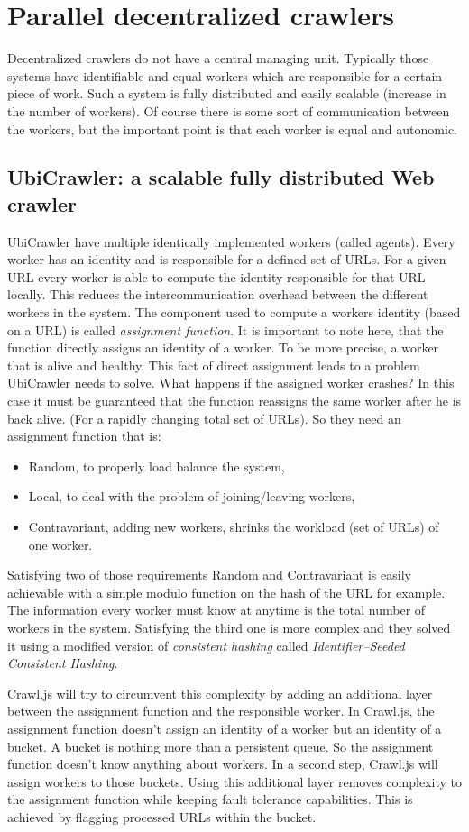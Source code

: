 \section{Parallel decentralized crawlers}
Decentralized crawlers do not have a central managing unit. Typically those systems have identifiable and equal workers which are responsible for a certain piece of work. Such a system is fully distributed and easily scalable (increase in the number of workers). Of course there is some sort of communication between the workers, but the important point is that each worker is equal and autonomic.

\subsection{UbiCrawler: a scalable fully distributed Web crawler \cite{ubicrawler}}
UbiCrawler have multiple identically implemented workers (called agents). Every worker has an identity and is responsible for a defined set of URLs. For a given URL every worker is able to compute the identity responsible for that URL locally. This reduces the intercommunication overhead between the different workers in the system. The component used to compute a workers identity (based on a URL) is called \emph{assignment function}. It is important to note here, that the function directly assigns an identity of a worker. To be more precise, a worker that is alive and healthy. This fact of direct assignment leads to a problem UbiCrawler needs to solve. What happens if the assigned worker crashes? In this case it must be guaranteed that the function reassigns the same worker after he is back alive. (For a rapidly changing total set of URLs). So they need an assignment function that is:
\begin{itemize}
\item Random, to properly load balance the system,
\item Local, to deal with the problem of joining/leaving workers,
\item Contravariant, adding new workers, shrinks the workload (set of URLs) of one worker.
\end{itemize}
Satisfying two of those requirements Random and Contravariant is easily achievable with a simple modulo function on the hash of the URL for example. The information every worker must know at anytime is the total number of workers in the system. Satisfying the third one is more complex and they solved it using a modified version of \emph{consistent hashing} called \emph{Identifier–Seeded Consistent Hashing}. 

Crawl.js will try to circumvent this complexity by adding an additional layer between the assignment function and the responsible worker. In Crawl.js, the assignment function doesn't assign an identity of a worker but an identity of a bucket. A bucket is nothing more than a persistent queue. So the assignment function doesn't know anything about workers. In a second step, Crawl.js will assign workers to those buckets. Using this additional layer removes complexity to the assignment function while keeping fault tolerance capabilities. This is achieved by flagging processed URLs within the bucket.
